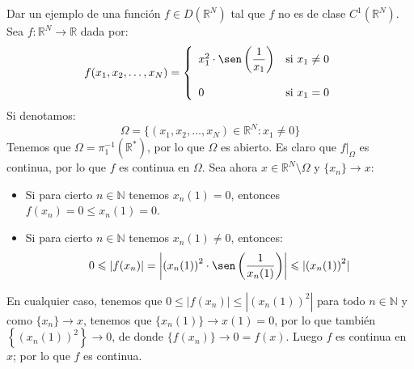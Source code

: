 \begin{ejercicio}
Dar un ejemplo de una función \( f \in D(\mathbb{R}^N) \) tal que \( f \) no es de clase \( C^1(\mathbb{R}^N) \).\\

\noindent
Sea $f:\mathbb{R}^N\to \mathbb{R}$ dada por:
\begin{equation*}
    f(x_1,x_2,\ldots,x_N) = \left\{\begin{array}{ll}
            x_1^2 \cdot \sen\left(\dfrac{1}{x_1}\right) & \text{si\ } x_1 \neq 0 \\
                                                  &\\
            0 & \text{si\ } x_1 = 0
    \end{array}\right.
\end{equation*}
Si denotamos:
\begin{equation*}
    \Omega = \{(x_1,x_2,\ldots,x_N)\in \mathbb{R}^N : x_1 \neq 0\}
\end{equation*}
Tenemos que $\Omega = \pi_1^{-1}(\mathbb{R}^\ast)$, por lo que $\Omega$ es abierto. Es claro que $f\big|_\Omega$ es continua, por lo que $f$ es continua en $\Omega$. Sea ahora $x\in \mathbb{R}^N\setminus \Omega$ y $\{x_n\} \to x$:
\begin{itemize}
    \item Si para cierto $n\in \mathbb{N}$ tenemos $x_n(1) = 0$, entonces $f(x_n) = 0 \leq x_n(1) = 0$.
    \item Si para cierto $n\in \mathbb{N}$ tenemos $x_n(1) \neq 0$, entonces:
        \begin{equation*}
            0 \leq |f(x_n)| = \left|{(x_n(1))}^{2}\cdot \sen\left(\dfrac{1}{x_n(1)}\right)\right| \leq |{(x_n(1))}^{2}|
        \end{equation*}
\end{itemize}
    En cualquier caso, tenemos que $0 \leq |f(x_n)| \leq |{(x_n(1))}^{2}|$ para todo $n\in \mathbb{N}$ y como $\{x_n\} \to x$, tenemos que $\{x_n(1)\} \to x(1) = 0$, por lo que también $\left\{{(x_n(1))}^{2}\right\}\to 0$, de donde $\{f(x_n)\} \to 0 = f(x)$. Luego $f$ es continua en $x$; por lo que $f$ es continua.\\


\end{ejercicio}

